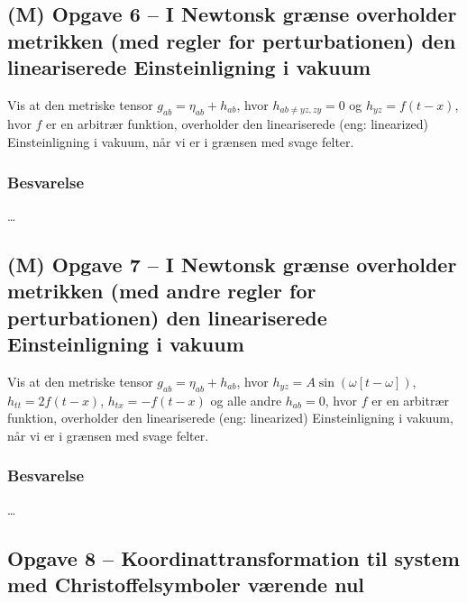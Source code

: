 \documentclass[../main.tex]{subfiles}
\begin{document}

\subsection{(M) Opgave 6 -- I Newtonsk grænse overholder metrikken (med regler for perturbationen) den lineariserede Einsteinligning i vakuum}
\setcounter{subsection}{6}
\setcounter{equation}{0}

Vis at den metriske tensor $g_{ab} = \eta_{ab} + h_{ab}$, hvor $h_{ab \ne yz,zy} = 0$ og $h_{yz} = f(t - x)$, hvor $f$ er en arbitrær funktion, overholder den lineariserede (eng: linearized) Einsteinligning i vakuum, når vi er i grænsen med svage felter.


\subsubsection{Besvarelse}

\ldots




\subsection{(M) Opgave 7 -- I Newtonsk grænse overholder metrikken (med andre regler for perturbationen) den lineariserede Einsteinligning i vakuum}
\setcounter{subsection}{7}
\setcounter{equation}{0}

Vis at den metriske tensor $g_{ab} = \eta_{ab} + h_{ab}$, hvor $h_{yz} = A \sin(\omega[t-\omega])$, $h_{tt} = 2 f(t - x)$, $h_{tx} = - f(t - x)$ og alle andre $h_{ab} = 0$, hvor $f$ er en arbitrær funktion, overholder den lineariserede (eng: linearized) Einsteinligning i vakuum, når vi er i grænsen med svage felter.


\subsubsection{Besvarelse}

\ldots




\subsection{Opgave 8 -- Koordinattransformation til system med Christoffelsymboler værende nul}
\setcounter{subsection}{8}
\setcounter{equation}{0}
\end{document}

